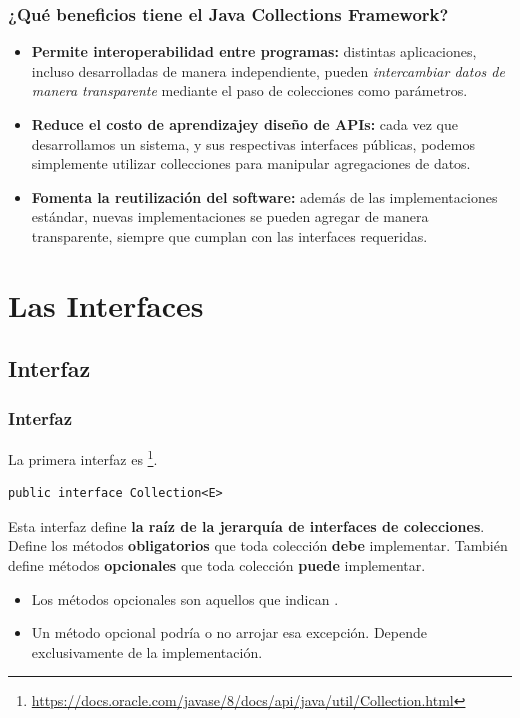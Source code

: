 \documentclass{beamer}
\begin{document}
\begin{frame}
  \frametitle{¿Qué beneficios tiene el Java Collections Framework?}

  \begin{itemize}
    
  \item \textbf{Permite interoperabilidad entre programas:} distintas
    aplicaciones, incluso desarrolladas de manera independiente,
    pueden \emph{intercambiar datos de manera transparente} mediante
    el paso de colecciones como parámetros.
    
  \item \textbf{Reduce el costo de aprendizajey diseño de APIs:} cada
    vez que desarrollamos un sistema, y sus respectivas interfaces
    públicas, podemos simplemente utilizar collecciones para manipular
    agregaciones de datos.
    
  \item \textbf{Fomenta la reutilización del software:} además de las
    implementaciones estándar, nuevas implementaciones se pueden
    agregar de manera transparente, siempre que cumplan con las
    interfaces requeridas.
    
  \end{itemize}
  
\end{frame}

\section{Las Interfaces}

\subsection{Interfaz }

\begin{frame}[fragile]
  \frametitle{Interfaz }

  La primera interfaz es
  \footnote{\url{https://docs.oracle.com/javase/8/docs/api/java/util/Collection.html}}.

\begin{verbatim}
public interface Collection<E>
\end{verbatim}

  Esta interfaz define \textbf{la raíz de la jerarquía de interfaces
    de colecciones}. Define los métodos \textbf{obligatorios} que toda
  colección \textbf{debe} implementar. También define métodos
  \textbf{opcionales} que toda colección \textbf{puede} implementar.

  \begin{itemize}
  \item Los métodos opcionales son aquellos que indican .
    
  \item Un método opcional podría o no arrojar esa excepción. Depende
    exclusivamente de la implementación.
  \end{itemize}
  
\end{frame}
\end{document}
